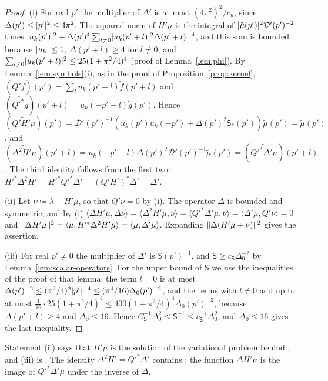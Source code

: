 \documentclass[11pt]{preprint}
\DeclarePairedDelimiter{\abs}{\lvert}{\rvert}
\DeclarePairedDelimiter{\norm}{\lVert}{\rVert}
\numberwithin{equation}{section}
\theoremstyle{definition}
\theoremstyle{remark}
\theoremstyle{plain}
\begin{document}
\begin{proof}
(i) For real $p'$ the multiplier of $\Delta'$ is at most $(4\pi^2)^2/c_u$, since $\Delta(p') \leq \abs{p'}^2 \leq 4\pi^2$. The squared norm of $H'\mu$ is the integral of $\abs{\tilde\mu(p')}^2\mathcal D'(p')^{-2}$ times $\abs{u_k(p')}^2 + \Delta(p')^4\sum_{l \neq 0}\abs{u_k(p' + l)}^2\Delta(p' + l)^{-4}$, and this sum is bounded because $\abs{u_k} \leq 1$, $\Delta(p' + l) \geq 4$ for $l \neq 0$, and $\sum_{l \neq 0}\abs{u_k(p' + l)}^2 \leq 25(1 + \pi^2/4)^4$ (proof of Lemma~\ref{lem:phi}). By Lemma~\ref{lem:symbols}(i), as in the proof of Proposition~\ref{prop:kernel}, $(\widetilde{Q'f})(p') = \sum_lu_k(p' + l)\tilde f(p' + l)$ and $(\widetilde{Q'^*g})(p' + l) = u_k(-p' - l)\tilde g(p')$. Hence $(\widetilde{Q'H'\mu})(p') = \mathcal D'(p')^{-1}(u_k(p')u_k(-p') + \Delta(p')^2\mathsf S_*(p'))\tilde\mu(p') = \tilde\mu(p')$, and $(\widetilde{\Delta^2H'\mu})(p' + l) = u_k(-p' - l)\Delta(p')^2\mathcal D'(p')^{-1}\tilde\mu(p') = (\widetilde{Q'^*\Delta'\mu})(p' + l)$. The third identity follows from the first two: $H'^*\Delta^2H' = H'^*Q'^*\Delta' = (Q'H')^*\Delta' = \Delta'$.

(ii) Let $\nu \coloneqq \lambda - H'\mu$, so that $Q'\nu = 0$ by (i). The operator $\Delta$ is bounded and symmetric, and by (i) $\langle\Delta H'\mu, \Delta\nu\rangle = \langle\Delta^2H'\mu, \nu\rangle = \langle Q'^*\Delta'\mu, \nu\rangle = \langle\Delta'\mu, Q'\nu\rangle = 0$ and $\norm{\Delta H'\mu}^2 = \langle\mu, H'^*\Delta^2H'\mu\rangle = \langle\mu, \Delta'\mu\rangle$. Expanding $\norm{\Delta(H'\mu + \nu)}^2$ gives the assertion.

(iii) For real $p' \neq 0$ the multiplier of $\Delta'$ is $\mathsf S(p')^{-1}$, and $\mathsf S \geq c_{\mathsf S}\Delta_0^{-2}$ by Lemma~\ref{lem:scalar-operators}. For the upper bound of $\mathsf S$ we use the inequalities of the proof of that lemma: the term $l = 0$ is at most $\Delta(p')^{-2} \leq (\pi^2/4)^2\abs{p'}^{-4} \leq (\pi^4/16)\Delta_0(p')^{-2}$, and the terms with $l \neq 0$ add up to at most $\frac{1}{16}\cdot 25(1 + \pi^2/4)^4 \leq 400(1 + \pi^2/4)^4\Delta_0(p')^{-2}$, because $\Delta(p' + l) \geq 4$ and $\Delta_0 \leq 16$. Hence $C_{\mathsf S}^{-1}\Delta_0^2 \leq \mathsf S^{-1} \leq c_{\mathsf S}^{-1}\Delta_0^2$, and $\Delta_0 \leq 16$ gives the last inequality.
\end{proof}

Statement (ii) says that $H'\mu$ is the solution of the variational problem behind \cite[(2.102)]{BalabanPRT2}, and (iii) is \cite[(2.109)]{BalabanPRT2}. The identity $\Delta^2H' = Q'^*\Delta'$ contains \cite[(2.99)]{BalabanPRT2}: the function $\Delta H'\mu$ is the image of $Q'^*\Delta'\mu$ under the inverse of $\Delta$.
\end{document}
